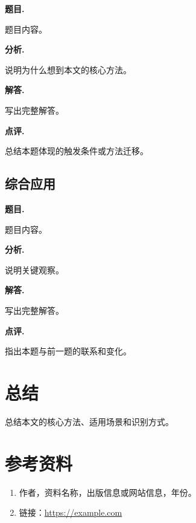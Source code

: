 \documentclass[10pt,a4paper,fontset=none]{ctexart}
\begin{document}
\textbf{题目.}

题目内容。

\textbf{分析.}

说明为什么想到本文的核心方法。

\textbf{解答.}

写出完整解答。

\textbf{点评.}

总结本题体现的触发条件或方法迁移。

\subsection{综合应用}

\textbf{题目.}

题目内容。

\textbf{分析.}

说明关键观察。

\textbf{解答.}

写出完整解答。

\textbf{点评.}

指出本题与前一题的联系和变化。

\section{总结}

总结本文的核心方法、适用场景和识别方式。

\section*{参考资料}

\begin{enumerate}
  \item 作者，资料名称，出版信息或网站信息，年份。
  \item 链接：\url{https://example.com}
\end{enumerate}
\end{document}
